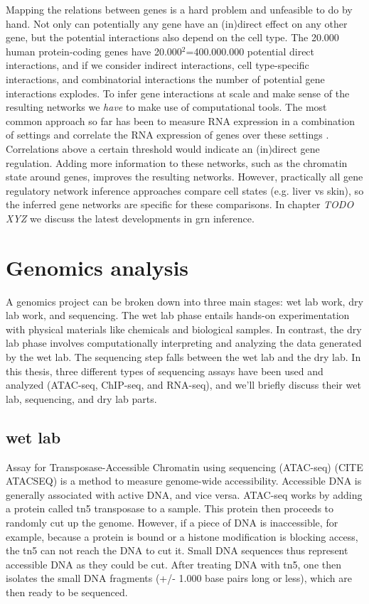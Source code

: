 Mapping the relations between genes is a hard problem and unfeasible to do by hand. Not only can potentially any gene have an (in)direct effect on any other gene, but the potential interactions also depend on the cell type. The 20.000 human protein-coding genes have 20.000$^2$=400.000.000 potential direct interactions, and if we consider indirect interactions, cell type-specific interactions, and combinatorial interactions the number of potential gene interactions explodes. To infer gene interactions at scale and make sense of the resulting networks we \textit{have} to make use of computational tools. The most common approach so far has been to measure RNA expression in a combination of settings and correlate the RNA expression of genes over these settings \cite{Zhang_2005,Margolin_2006}. Correlations above a certain threshold would indicate an (in)direct gene regulation. Adding more information to these networks, such as the chromatin state around genes\cite{Xu_2020,Kamal_2021}, improves the resulting networks. However, practically all gene regulatory network inference approaches compare cell states (e.g. liver vs skin), so the inferred gene networks are specific for these comparisons. In chapter \textit{TODO XYZ} we discuss the latest developments in grn inference.

\section{Genomics analysis}

A genomics project can be broken down into three main stages: wet lab work, dry lab work, and sequencing. The wet lab phase entails hands-on experimentation with physical materials like chemicals and biological samples. In contrast, the dry lab phase involves computationally interpreting and analyzing the data generated by the wet lab. The sequencing step falls between the wet lab and the dry lab. In this thesis, three different types of sequencing assays have been used and analyzed (ATAC-seq, ChIP-seq, and RNA-seq), and we'll briefly discuss their wet lab, sequencing, and dry lab parts. 

\subsection{wet lab}

Assay for Transposase-Accessible Chromatin using sequencing (ATAC-seq) (CITE ATACSEQ) is a method to measure genome-wide accessibility. Accessible DNA is generally associated with active DNA, and vice versa. ATAC-seq works by adding a protein called tn5 transposase to a sample. This protein then proceeds to randomly cut up the genome. However, if a piece of DNA is inaccessible, for example, because a protein is bound or a histone modification is blocking access, the tn5 can not reach the DNA to cut it. Small DNA sequences thus represent accessible DNA as they could be cut. After treating DNA with tn5, one then isolates the small DNA fragments (+/- 1.000 base pairs long or less), which are then ready to be sequenced.

